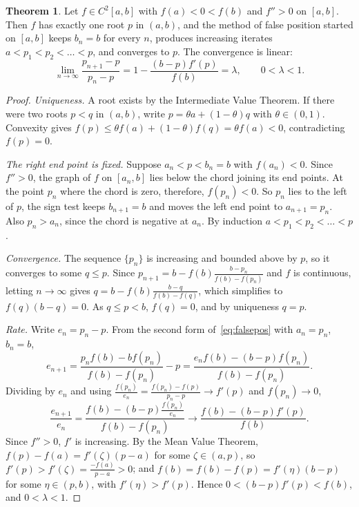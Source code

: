 \documentclass[11pt,a4paper]{article}
\numberwithin{equation}{section}
\theoremstyle{definition}
\newtheorem{thm}{Theorem}[subsection]
\begin{document}
\begin{thm}
\label{thm:falsepos}
Let $f\in C^2[a,b]$ with $f(a)<0<f(b)$ and $f''>0$ on $[a,b]$. Then $f$ has exactly one root $p$ in $(a,b)$, and the method of false
position started on $[a,b]$ keeps $b_n = b$ for every $n$, produces increasing iterates $a<p_1<p_2<\dots<p$, and converges to $p$. The
convergence is linear:
$$\lim_{n\rightarrow\infty}\frac{p_{n+1}-p}{p_n-p} = 1-\frac{(b-p)f'(p)}{f(b)} = \lambda,\qquad 0<\lambda<1 .$$
\end{thm}

\begin{proof}
\emph{Uniqueness.} A root exists by the Intermediate Value Theorem. If there were two roots $p<q$ in $(a,b)$, write
$p = \theta a+(1-\theta)q$ with $\theta\in(0,1)$. Convexity gives $f(p)\leq\theta f(a)+(1-\theta)f(q) = \theta f(a)<0$, contradicting
$f(p) = 0$.

\emph{The right end point is fixed.} Suppose $a_n<p<b_n = b$ with $f(a_n)<0$. Since $f''>0$, the graph of $f$ on $[a_n,b]$ lies below
the chord joining its end points. At the point $p_n$ where the chord is zero, therefore, $f(p_n)<0$. So $p_n$ lies to the left of $p$,
the sign test keeps $b_{n+1} = b$ and moves the left end point to $a_{n+1} = p_n$. Also $p_n>a_n$, since the chord is negative at
$a_n$. By induction $a<p_1<p_2<\dots<p$.

\emph{Convergence.} The sequence $\{p_n\}$ is increasing and bounded above by $p$, so it converges to some $q\leq p$. Since
$p_{n+1} = b-f(b)\frac{b-p_n}{f(b)-f(p_n)}$ and $f$ is continuous, letting $n\longrightarrow\infty$ gives
$q = b-f(b)\frac{b-q}{f(b)-f(q)}$, which simplifies to $f(q)(b-q) = 0$. As $q\leq p<b$, $f(q) = 0$, and by uniqueness $q = p$.

\emph{Rate.} Write $e_n = p_n-p$. From the second form of~\eqref{eq:falsepos} with $a_n = p_n$, $b_n = b$,
$$e_{n+1} = \frac{p_nf(b)-bf(p_n)}{f(b)-f(p_n)}-p = \frac{e_nf(b)-(b-p)f(p_n)}{f(b)-f(p_n)} .$$
Dividing by $e_n$ and using $\frac{f(p_n)}{e_n} = \frac{f(p_n)-f(p)}{p_n-p}\longrightarrow f'(p)$ and $f(p_n)\longrightarrow0$,
$$\frac{e_{n+1}}{e_n} = \frac{f(b)-(b-p)\frac{f(p_n)}{e_n}}{f(b)-f(p_n)}\longrightarrow\frac{f(b)-(b-p)f'(p)}{f(b)} .$$
Since $f'' > 0$, $f'$ is increasing. By the Mean Value Theorem, $f(p)-f(a) = f'(\zeta)(p-a)$ for some $\zeta\in(a,p)$, so
$f'(p)>f'(\zeta) = \frac{-f(a)}{p-a}>0$; and $f(b) = f(b)-f(p) = f'(\eta)(b-p)$ for some $\eta\in(p,b)$, with $f'(\eta)>f'(p)$. Hence
$0<(b-p)f'(p)<f(b)$, and $0<\lambda<1$.
\end{proof}
\end{document}
